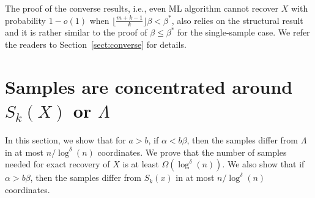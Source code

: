 \documentclass{article}
\begin{document}
The proof of the converse results, i.e., even ML algorithm cannot recover $X$ with probability $1-o(1)$ when $\lfloor \frac{m+k-1}{k} \rfloor \beta < \beta^\ast$, also relies on the structural result and it is rather similar to the proof of $\beta\le\beta^\ast$ for the single-sample case. We refer the readers to Section~\ref{sect:converse} for details.

\section{Samples are concentrated around $S_k(X)$ or $\Lambda$} \label{sect:aln}
In this section, we show that for $a>b$, if $\alpha<b\beta$, then the samples differ from  $\Lambda$ in at most $n/\log^{\delta}(n)$ coordinates.
We prove that the number of samples needed for exact recovery of $X$ is at least $\Omega(\log^{\delta}(n))$. We also show that if $\alpha > b\beta$, then the samples differ from  $S_k(x)$ in at most $n/\log^{\delta}(n)$ coordinates.
\end{document}
